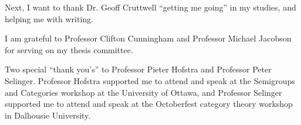 \documentclass{ucalgthes1}
\begin{document}
Next, I want to thank Dr. Geoff Cruttwell ``getting me going'' in my studies, and helping me with writing.


I am grateful to Professor Clifton Cunningham and Professor Michael Jacobson for serving on my thesis committee.


Two special ``thank you's'' to Professor Pieter Hofstra and Professor Peter Selinger.  Professor Hofstra supported me to attend and speak at the Semigroups and Categories workshop at the University of Ottawa, and Professor Selinger supported me to attend and speak at the Octoberfest category theory workshop in Dalhousie University.


\begin{singlespace}
\newpage
{}
\tableofcontents
\pagestyle{plain}
\newpage
{}
\listoftables
\pagestyle{plain}
\newpage
{}
\pagestyle{plain}
\clearpage
\end{singlespace}
\clearpage          %




% 



%
\end{document}
